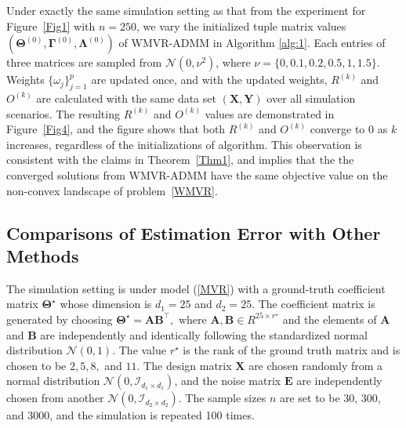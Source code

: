 \documentclass[alpha-refs]{wiley-article}
\begin{document}
Under exactly the same simulation setting as that from the experiment for Figure~\ref{Fig1} with $n=250$, we vary the initialized tuple matrix values $(\boldsymbol{\Theta}^{(0)},\boldsymbol{\Gamma}^{(0)},\boldsymbol{\Lambda}^{(0)})$ of WMVR-ADMM in Algorithm \ref{alg:1}. Each entries of three matrices are sampled from $\mathcal{N}(0,\nu^{2})$, where $\nu=\{0,0.1,0.2,0.5,1,1.5\}$. Weights $\{\omega_j\}_{j=1}^{p}$ are updated once, and with the updated weights, $R^{(k)}$ and $O^{(k)}$ are calculated with the same data set $(\boldsymbol{X},\boldsymbol{Y})$ over all simulation scenarios. The resulting  $R^{(k)}$ and $O^{(k)}$ values are demonstrated in Figure~\ref{Fig4}, and the figure shows that both $R^{(k)}$ and $O^{(k)}$ converge to 0 as $k$ increases, regardless of the initializations of algorithm.  This observation is consistent with the claims in Theorem~\ref{Thm1}, and implies that the the converged solutions from WMVR-ADMM have the same objective value on the non-convex landscape of problem~\eqref{WMVR}.

\subsection{Comparisons of Estimation Error with Other Methods}

The simulation setting is under model (\ref{MVR}) with a ground-truth coefficient matrix $\boldsymbol{\Theta}^{\star}$  whose dimension is $d_{1} = 25$ and $d_{2} = 25$. 
The coefficient matrix is generated by choosing $\boldsymbol{\Theta}^{\star}  = \boldsymbol{A}\boldsymbol{B}^{\top},$ where $\boldsymbol{A}, \boldsymbol{B} \in R^{25 \times r^{\star}}$ and the elements of  $\boldsymbol{A}$ and $\boldsymbol{B}$ are independently and identically following the standardized normal distribution $\mathcal{N}(0, 1)$. 
The value $r^{\star}$ is the rank of the ground truth matrix and is chosen to be $2, 5, 8,$ and $11$. 
The design matrix $\boldsymbol{X}$ are chosen randomly from a normal distribution $\mathcal{N}(0, \mathcal{I}_{ d_{1} \times d_{1}})$, and the noise matrix $\boldsymbol{E}$ are independently chosen from another $\mathcal{N}(0, \mathcal{I}_{ d_{2} \times d_{2}})$. 
The sample sizes $n$ are set to be 30, 300, and 3000, and the simulation is repeated 100 times. 
\end{document}
